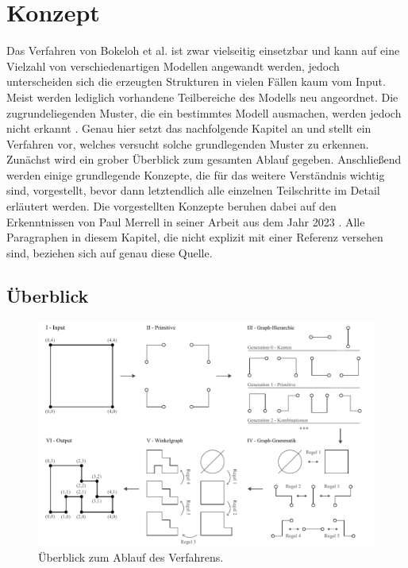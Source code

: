%

\chapter{Konzept}
\label{chap:konzept}
Das Verfahren von Bokeloh et al. \cite{3_bokeloh_et_al} ist zwar vielseitig einsetzbar und kann auf eine Vielzahl von verschiedenartigen
Modellen angewandt werden, jedoch unterscheiden sich die erzeugten Strukturen in vielen Fällen kaum vom Input. Meist werden lediglich
vorhandene Teilbereiche des Modells neu angeordnet. Die zugrundeliegenden Muster, die ein bestimmtes Modell ausmachen, werden jedoch
nicht erkannt \cite{1_merrell}. Genau hier setzt das nachfolgende Kapitel an und stellt ein Verfahren vor, welches versucht solche grundlegenden Muster
zu erkennen. Zunächst wird ein grober Überblick zum gesamten Ablauf gegeben. Anschließend werden einige grundlegende Konzepte, die für
das weitere Verständnis wichtig sind, vorgestellt, bevor dann letztendlich alle einzelnen Teilschritte im Detail erläutert werden.
Die vorgestellten Konzepte beruhen dabei auf den Erkenntnissen von Paul Merrell in seiner Arbeit aus dem Jahr 2023 \cite{1_merrell}.
Alle Paragraphen in diesem Kapitel, die nicht explizit mit einer Referenz versehen sind, beziehen sich auf genau diese Quelle.

\section{Überblick}

\begin{figure}[t]
    \centering
    \includegraphics[width=\imgWidth]{images/overview.pdf}
    \caption{Überblick zum Ablauf des Verfahrens.}
    \label{fig:overview}
\end{figure}

